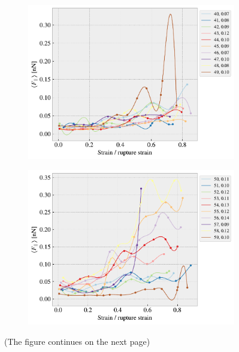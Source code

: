 \begin{figure}[H]
\begin{subfigure}[b]{0.49\textwidth}
        \includegraphics[width=\textwidth]{figures/stretch_profiles/RW/SP_4_RW.pdf}
        \caption{}
    \end{subfigure}
    \hfill
    \begin{subfigure}[b]{0.49\textwidth}
        \centering
        \includegraphics[width=\textwidth]{figures/stretch_profiles/RW/SP_5_RW.pdf}
        \caption{}
    \end{subfigure}
    \hfill
    \caption{(The figure continues on the next page)}
\end{figure}


